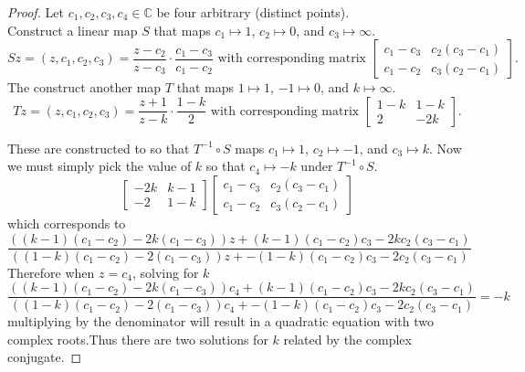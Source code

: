 \documentclass{article}
\begin{document}
\begin{proof}
  Let $c_1, c_2, c_3, c_4 \in \mathbb{C}$ be four arbitrary (distinct points).\\
  Construct a linear map $S$ that maps
  $c_1 \mapsto 1$, $c_2 \mapsto 0$, and $c_3 \mapsto \infty$. \[
    Sz = (z, c_1, c_2, c_3) = \frac{z-c_2}{z-c_3}\cdot\frac{c_1-c_3}{c_1-c_2}
    \text{ with corresponding matrix }
    \begin{bmatrix}
      c_1 - c_3 & c_2(c_3 - c_1) \\
      c_1 - c_2 & c_3(c_2 - c_1)
    \end{bmatrix}.
  \]
  The construct another map $T$ that maps
  $1 \mapsto 1$, $-1 \mapsto 0$, and $k \mapsto \infty$. \[
    Tz = (z, c_1, c_2, c_3) = \frac{z + 1}{z-k}\cdot\frac{1-k}{2}
    \text{ with corresponding matrix }
    \begin{bmatrix}
      1 - k & 1 - k \\
      2 & -2k
    \end{bmatrix}.
  \]

  These are constructed to so that $T^{-1} \circ S$ maps $c_1 \mapsto 1$,
  $c_2 \mapsto -1$, and $c_3 \mapsto k$.
  Now we must simply pick the value of $k$ so that $c_4 \mapsto -k$ under
  $T^{-1} \circ S$. \[
  \begin{bmatrix}
    -2k & k-1 \\
    -2 & 1 - k
  \end{bmatrix}\begin{bmatrix}
    c_1 - c_3 & c_2(c_3 - c_1) \\
    c_1 - c_2 & c_3(c_2 - c_1)
  \end{bmatrix}
  \] which corresponds to \[
    \frac{
      ((k - 1) (c_1 - c_2) - 2 k (c_1 - c_3))z +
      (k - 1) (c_1 - c_2) c_3 - 2 k c_2 (c_3 - c_1)
    }{
      ((1 - k) (c_1 - c_2) - 2 (c_1 - c_3))z +
      -(1 - k) (c_1 - c_2) c_3 - 2 c_2 (c_3 - c_1)
    }
  \]
  Therefore when $z = c_4$, solving for $k$ \[
  \frac{
    ((k - 1) (c_1 - c_2) - 2 k (c_1 - c_3))c_4 + (k - 1) (c_1 - c_2) c_3 - 2 k c_2 (c_3 - c_1)
  }{
    ((1 - k) (c_1 - c_2) - 2 (c_1 - c_3))c_4 +
    -(1 - k) (c_1 - c_2) c_3 - 2 c_2 (c_3 - c_1)
  } = -k
  \] multiplying by the denominator will result in a quadratic equation with two
  complex roots.Thus there are two solutions for $k$ related by the complex
  conjugate.
\end{proof}
\end{document}
